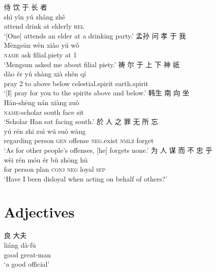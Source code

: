 \documentclass[UTF8, a4paper, oneside, scheme=plain, 12pt]{ctexrep}
\newcommand{\translate}[1]{`#1'}
\newcommand*{\category}[1]{\textsc{#1}}
\begin{document}
\begin{exe}
    \ex\label{ex:grammatical.clause.peripheral.postverbal.1}
    \glll 侍 饮 于 长 者 \\
    shì yǐn yú zhǎng zhě \\
    attend drink at elderly \category{rel} \\
    \glt\translate{[One] attends an elder at a drinking party.}
    \ex\label{ex:grammatical.clause.peripheral.postverbal.2}
    \glll 孟孙 问 孝 于 我 \\
    Mèngsūn wèn xiào yú wǒ \\
    \category{name} ask filial.piety at 1 \\
    \glt\translate{Mengsun asked me about filial piety.}
    \ex\label{ex:grammatical.clause.peripheral.postverbal.3}
    \glll 祷 尔 于 上 下 神 祇 \\
    dǎo ěr yú shàng xià shén qí \\
    pray 2 to above below celestial.spirit earth.spirit \\
    \glt\translate{[I] pray for you to the spirits above and below.}
    \ex\label{ex:grammatical.clause.peripheral.preverbal.1}
    \glll 韩生 南 向 坐 \\
    Hán-shēng nán xiàng zuò \\
    \category{name}-scholar south face sit \\
    \glt\translate{Scholar Han sat facing south.}
    \ex\label{ex:grammatical.clause.peripheral.preverbal.2}
    \glll 於 人 之 罪 无 所 忘 \\
    yú rén zhī zuì wú suǒ wàng \\
    regarding person \category{gen} offense \category{neg}.exist \category{nmlz} forget \\
    \glt\translate{As for other people's offenses, [he] forgets none.}
    \ex\label{ex:grammatical.clause.peripheral.preverbal.3}
    \glll 为 人 谋 而 不 忠 乎 \\
    wèi rén móu ér bù zhōng hū \\
    for person plan \category{conj} \category{neg} loyal \category{sfp} \\
    \glt\translate{Have I been disloyal when acting on behalf of others?}
\end{exe}

\chapter{Adjectives}\label{chap:adjectives}

\begin{exe}
    \ex\label{ex:adjectives.1}
    \glll 良 大夫 \\
    liáng dà-fū \\
    good great-man \\
    \glt\translate{a good official}
\end{exe}
\end{document}
